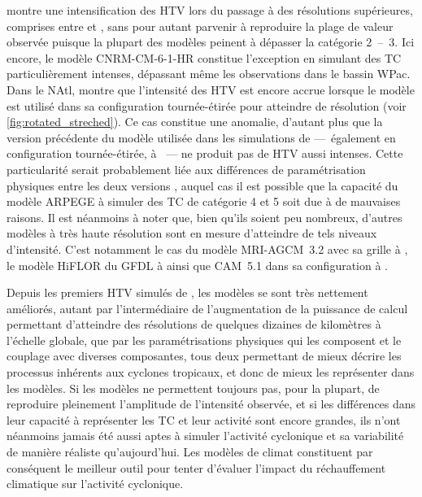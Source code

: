 \documentclass[../main.tex]{subfiles}
\begin{document}
\cite{roberts_impact_2020} montre une intensification des HTV lors du passage à des résolutions supérieures, comprises entre  et , sans pour
autant parvenir à reproduire la plage de valeur observée puisque la plupart des modèles peinent à dépasser la catégorie \num{2}~--~\num{3}. Ici encore, le
modèle CNRM-CM-6-1-HR constitue l'exception en simulant des TC particulièrement intenses, dépassant même les observations dans le bassin WPac. Dans le NAtl,
\cite{chauvin_future_2020} montre que l'intensité des HTV est encore accrue lorsque le modèle est utilisé dans sa configuration tournée-étirée pour atteindre
 de résolution (voir \cref{fig:rotated_streched}). Ce cas constitue une anomalie, d'autant plus que la version précédente du modèle utilisée dans les
simulations de \cite{daloz_impact_2012} ---~également en configuration tournée-étirée, à ~--- ne produit pas de HTV aussi intenses. Cette particularité
serait probablement liée aux différences de paramétrisation physiques entre les deux versions \parencite{chauvin_future_2020}, auquel cas il est possible que la
capacité du modèle ARPEGE à simuler des TC de catégorie \num{4} et \num{5} soit due à de mauvaises raisons. Il est néanmoins à noter que, bien qu'ils soient peu
nombreux, d'autres modèles à très haute résolution sont en mesure d'atteindre de tels niveaux d'intensité. C'est notamment le cas du modèle MRI-AGCM~3.2 avec
sa grille à  \parencite{murakami_future_2012}, le modèle HiFLOR du GFDL à  \parencite{murakami_simulation_2015} ainsi que CAM~5.1 dans sa
configuration à  \parencite{wehner_effect_2014}.

Depuis les premiers HTV simulés de \cite{manabe_tropical_1970}, les modèles se sont très nettement améliorés, autant par l'intermédiaire de l'augmentation de la
puissance de calcul permettant d'atteindre des résolutions de quelques dizaines de kilomètres à l'échelle globale, que par les paramétrisations physiques qui
les composent et le couplage avec diverses composantes, tous deux permettant de mieux décrire les processus inhérents aux cyclones tropicaux, et donc de mieux
les représenter dans les modèles. Si les modèles ne permettent toujours pas, pour la plupart, de reproduire pleinement l'amplitude de l'intensité observée, et
si les différences dans leur capacité à représenter les TC et leur activité sont encore grandes, ils n'ont néanmoins jamais été aussi aptes à
simuler l'activité cyclonique et sa variabilité de manière réaliste qu'aujourd'hui. Les modèles de climat constituent par conséquent le meilleur outil pour
tenter d'évaluer l'impact du réchauffement climatique sur l'activité cyclonique.
\end{document}
